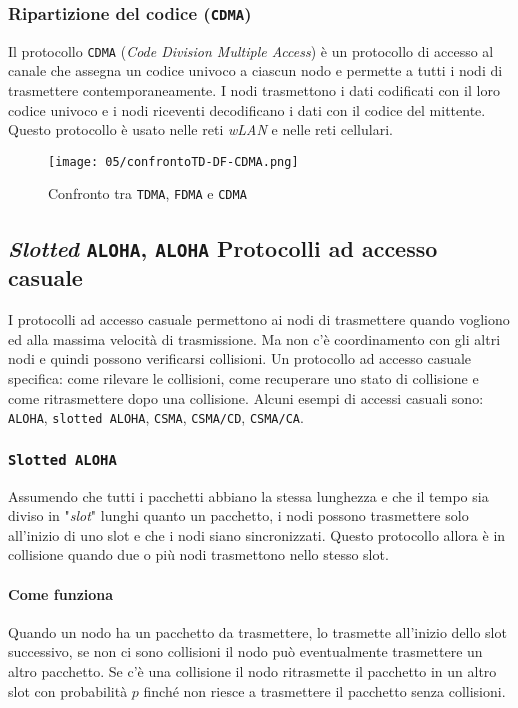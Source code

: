         \subsubsection{Ripartizione del codice (\texttt{CDMA})}
            Il protocollo \texttt{CDMA} (\textit{Code Division Multiple Access}) è un protocollo di accesso al canale che assegna un codice univoco a ciascun nodo e permette a tutti i nodi di trasmettere contemporaneamente. I nodi trasmettono i dati codificati con il loro codice univoco e i nodi riceventi decodificano i dati con il codice del mittente. Questo protocollo è usato nelle reti \textit{wLAN} e nelle reti cellulari.
        \begin{figure}[H]
            \centering
            \texttt{[image: 05/confrontoTD-DF-CDMA.png]}
            \caption{Confronto tra \texttt{TDMA}, \texttt{FDMA} e \texttt{CDMA}}
        \end{figure}
    \subsection{\textit{Slotted} \texttt{ALOHA}, \texttt{ALOHA} Protocolli ad accesso casuale}
            I protocolli ad accesso casuale permettono ai nodi di trasmettere quando vogliono ed alla massima velocità di trasmissione. Ma non c'è coordinamento con gli altri nodi e quindi possono verificarsi collisioni.\newline
            Un protocollo ad accesso casuale specifica: come rilevare le collisioni, come recuperare uno stato di collisione e come ritrasmettere dopo una collisione.\newline
            Alcuni esempi di accessi casuali sono: \texttt{ALOHA}, \texttt{slotted ALOHA}, \texttt{CSMA}, \texttt{CSMA/CD}, \texttt{CSMA/CA}.
        \subsubsection{\texttt{Slotted ALOHA}}
            Assumendo che tutti i pacchetti abbiano la stessa lunghezza e che il tempo sia diviso in "\textit{slot}" lunghi quanto un pacchetto, i nodi possono trasmettere solo all'inizio di uno slot e che i nodi siano sincronizzati. Questo protocollo allora è in collisione quando due o più nodi trasmettono nello stesso slot.
            \paragraph{Come funziona} Quando un nodo ha un pacchetto da trasmettere, lo trasmette all'inizio dello slot successivo, se non ci sono collisioni il nodo può eventualmente trasmettere un altro pacchetto. Se c'è una collisione il nodo ritrasmette il pacchetto in un altro slot con probabilità $p$ finché non riesce a trasmettere il pacchetto senza collisioni.
